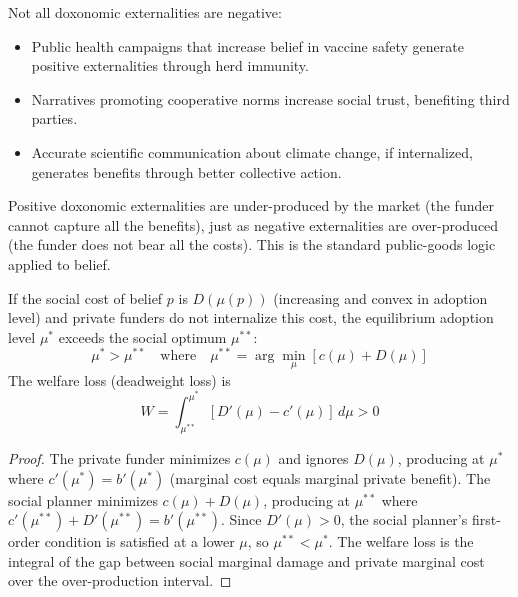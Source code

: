 \begin{example}
\label{ex:positive-externality}
Not all doxonomic externalities are negative:
\begin{itemize}[nosep]
  \item Public health campaigns that increase belief in vaccine safety generate positive externalities through herd immunity.
  \item Narratives promoting cooperative norms increase social trust, benefiting third parties.
  \item Accurate scientific communication about climate change, if internalized, generates benefits through better collective action.
\end{itemize}
Positive doxonomic externalities are under-produced by the market (the funder cannot capture all the benefits), just as negative externalities are over-produced (the funder does not bear all the costs).
This is the standard public-goods logic applied to belief.
\end{example}

\begin{theorem}
\label{thm:welfare-loss}
If the social cost of belief $p$ is $D(\mu(p))$ (increasing and convex in adoption level) and private funders do not internalize this cost, the equilibrium adoption level $\mu^*$ exceeds the social optimum $\mu^{**}$:
\[
  \mu^* > \mu^{**} \quad \text{where} \quad \mu^{**} = \arg\min_{\mu} \left[ c(\mu) + D(\mu) \right]
\]
The welfare loss (deadweight loss) is
\[
  W = \int_{\mu^{**}}^{\mu^*} [D'(\mu) - c'(\mu)] \, d\mu > 0
\]
\end{theorem}

\begin{proof}
The private funder minimizes $c(\mu)$ and ignores $D(\mu)$, producing at $\mu^*$ where $c'(\mu^*) = b'(\mu^*)$ (marginal cost equals marginal private benefit).
The social planner minimizes $c(\mu) + D(\mu)$, producing at $\mu^{**}$ where $c'(\mu^{**}) + D'(\mu^{**}) = b'(\mu^{**})$.
Since $D'(\mu) > 0$, the social planner's first-order condition is satisfied at a lower $\mu$, so $\mu^{**} < \mu^*$.
The welfare loss is the integral of the gap between social marginal damage and private marginal cost over the over-production interval.
\end{proof}

